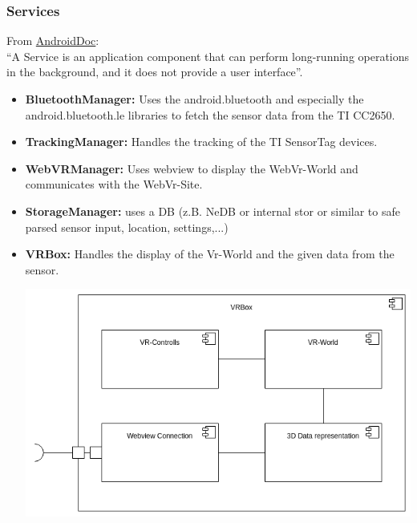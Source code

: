 \subsubsection{Services}
From \href{https://developer.android.com/guide/components/services.html}{AndroidDoc}: \\
``A Service is an application component that can perform long-running operations in the background, and it does not provide a user interface''.
\begin{itemize}
  \item \textbf{BluetoothManager:} Uses the android.bluetooth and especially the android.bluetooth.le libraries to fetch the sensor data from the TI CC2650.
  \item \textbf{TrackingManager:} Handles the tracking of the TI SensorTag devices.
  \item \textbf{WebVRManager:} Uses webview to display the WebVr-World and communicates with the WebVr-Site.
  \item \textbf{StorageManager:} uses a DB (z.B. NeDB or internal stor or similar to safe parsed sensor input, location, settings,...)
  \item \textbf{VRBox:} Handles the display of the Vr-World and the given data from the sensor.

  \includegraphics[scale=0.35]{pics/VRBox.png}

\end{itemize}


